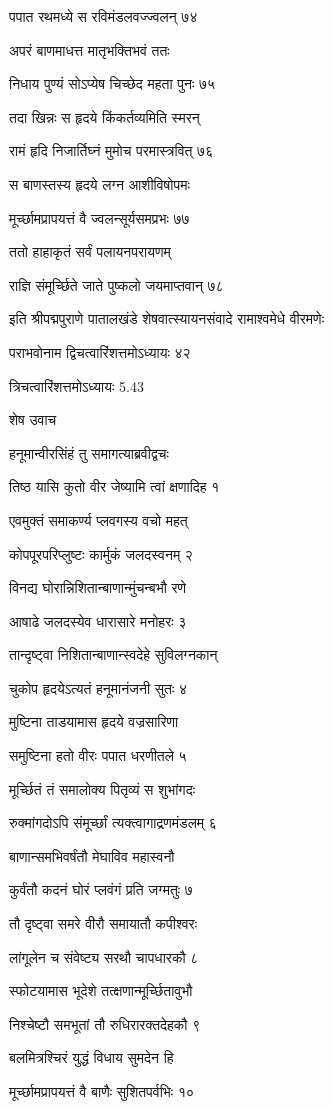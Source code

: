 पपात रथमध्ये स रविमंडलवज्ज्वलन् ७४

अपरं बाणमाधत्त मातृभक्तिभवं ततः

निधाय पुण्यं सोऽप्येष चिच्छेद महता पुनः ७५

तदा खिन्नः स हृदये किंकर्तव्यमिति स्मरन्

रामं हृदि निजार्तिघ्नं मुमोच परमास्त्रवित् ७६

स बाणस्तस्य हृदये लग्न आशीविषोपमः

मूर्च्छामप्रापयत्तं वै ज्वलन्सूर्यसमप्रभः ७७

ततो हाहाकृतं सर्वं पलायनपरायणम्

राज्ञि संमूर्च्छिते जाते पुष्कलो जयमाप्तवान् ७८

इति श्रीपद्मपुराणे पातालखंडे शेषवात्स्यायनसंवादे रामाश्वमेधे वीरमणेः

पराभवोनाम द्विचत्वारिंशत्तमोऽध्यायः ४२

त्रिचत्वारिंशत्तमोऽध्यायः 5.43

शेष उवाच

हनूमान्वीरसिंहं तु समागत्याब्रवीद्वचः

तिष्ठ यासि कुतो वीर जेष्यामि त्वां क्षणादिह १

एवमुक्तं समाकर्ण्य प्लवगस्य वचो महत्

कोपपूरपरिप्लुष्टः कार्मुकं जलदस्वनम् २

विनद्य घोरान्निशितान्बाणान्मुंचन्बभौ रणे

आषाढे जलदस्येव धारासारे मनोहरः ३

तान्दृष्ट्वा निशितान्बाणान्स्वदेहे सुविलग्नकान्

चुकोप हृदयेऽत्यतं हनूमानंजनी सुतः ४

मुष्टिना ताडयामास हृदये वज्रसारिणा

समुष्टिना हतो वीरः पपात धरणीतले ५

मूर्च्छितं तं समालोक्य पितृव्यं स शुभांगदः

रुक्मांगदोऽपि संमूर्च्छां त्यक्त्वागाद्रणमंडलम् ६

बाणान्समभिवर्षंतौ मेघाविव महास्वनौ

कुर्वंतौ कदनं घोरं प्लवंगं प्रति जग्मतुः ७

तौ दृष्ट्वा समरे वीरौ समायातौ कपीश्वरः

लांगूलेन च संवेष्ट्य सरथौ चापधारकौ ८

स्फोटयामास भूदेशे तत्क्षणान्मूर्च्छितावुभौ

निश्चेष्टौ समभूतां तौ रुधिरारक्तदेहकौ ९

बलमित्रश्चिरं युद्धं विधाय सुमदेन हि

मूर्च्छामप्रापयत्तं वै बाणैः सुशितपर्वभिः १०

